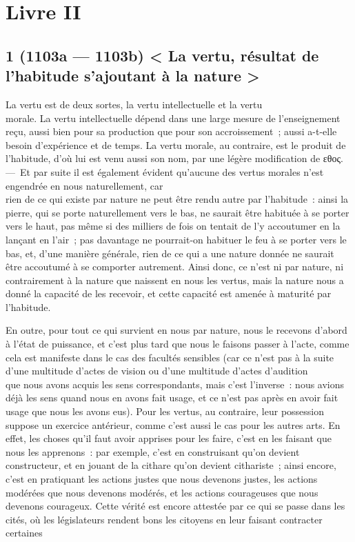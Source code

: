 \documentclass[french,twoside]{book} %
\begin{document}
\section[{Livre II}]{Livre II}\renewcommand{\leftmark}{Livre II}

\subsection[{1 (1103a — 1103b) < La vertu, résultat de l’habitude s’ajoutant à la nature >}]{1 (1103a — 1103b) < La vertu, résultat de l’habitude s’ajoutant à la nature >}
\noindent La vertu est de deux sortes, la vertu intellectuelle et la vertu \\
morale. La vertu intellectuelle dépend dans une large mesure de l’enseignement reçu, aussi bien pour sa production que pour son accroissement ; aussi a-t-elle besoin d’expérience et de temps. La vertu morale, au contraire, est le produit de l’habitude, d’où lui est venu aussi son nom, par une légère modification de εθος. — Et par suite il est également évident qu’aucune des vertus morales n’est engendrée en nous naturellement, car \\
rien de ce qui existe par nature ne peut être rendu autre par l’habitude : ainsi la pierre, qui se porte naturellement vers le bas, ne saurait être habituée à se porter vers le haut, pas même si des milliers de fois on tentait de l’y accoutumer en la lançant en l’air ; pas davantage ne pourrait-on habituer le feu à se porter vers le bas, et, d’une manière générale, rien de ce qui a une nature donnée ne saurait être accoutumé à se comporter autrement. Ainsi donc, ce n’est ni par nature, ni contrairement à la nature que naissent en nous les vertus, mais la nature nous a \\
donné la capacité de les recevoir, et cette capacité est amenée à maturité par l’habitude.\par
En outre, pour tout ce qui survient en nous par nature, nous le recevons d’abord à l’état de puissance, et c’est plus tard que nous le faisons passer à l’acte, comme cela est manifeste dans le cas des facultés sensibles (car ce n’est pas à la suite d’une multitude d’actes de vision ou d’une multitude d’actes d’audition \\
que nous avons acquis les sens correspondants, mais c’est l’inverse : nous avions déjà les sens quand nous en avons fait usage, et ce n’est pas après en avoir fait usage que nous les avons eus). Pour les vertus, au contraire, leur possession suppose un exercice antérieur, comme c’est aussi le cas pour les autres arts. En effet, les choses qu’il faut avoir apprises pour les faire, c’est en les faisant que nous les apprenons : par exemple, c’est en construisant qu’on devient constructeur, et en jouant de la cithare qu’on devient cithariste ; ainsi encore,  c’est en pratiquant les actions justes que nous devenons justes, les actions modérées que nous devenons modérés, et les actions courageuses que nous devenons courageux. Cette vérité est encore attestée par ce qui se passe dans les cités, où les législateurs rendent bons les citoyens en leur faisant contracter certaines \\
\end{document}
